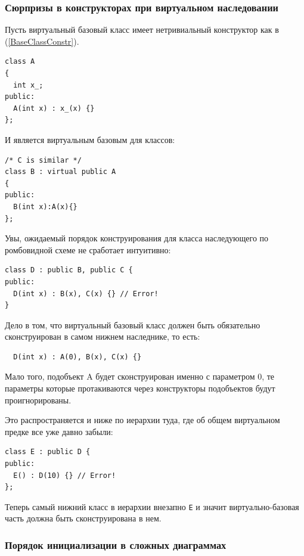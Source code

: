 \documentclass[a4paper,12pt,oneside]{article}
\begin{document}
\subsubsection{Сюрпризы в конструкторах при виртуальном наследовании}\label{VirtualBaseClassConstr}

Пусть виртуальный базовый класс имеет нетривиальный конструктор как в (\ref{BaseClassConstr}).

\begin{lstlisting}
class A 
{
  int x_;
public:
  A(int x) : x_(x) {}
};
\end{lstlisting}

И является виртуальным базовым для классов:

\begin{lstlisting}
/* C is similar */
class B : virtual public A
{
public:
  B(int x):A(x){}
};
\end{lstlisting}

Увы, ожидаемый порядок конструирования для класса наследующего по ромбовидной схеме не сработает интуитивно:

\begin{lstlisting}
class D : public B, public C {
public:
  D(int x) : B(x), C(x) {} // Error!
}
\end{lstlisting}

Дело в том, что виртуальный базовый класс должен быть обязательно сконструирован в самом нижнем наследнике, то есть:

\begin{lstlisting}
  D(int x) : A(0), B(x), C(x) {} 
\end{lstlisting}

Мало того, подобъект A будет сконструирован именно с параметром 0, те параметры которые протакиваются через конструкторы подобъектов будут проигнорированы.

Это распространяется и ниже по иерархии туда, где об общем виртуальном предке все уже давно забыли:

\begin{lstlisting}
class E : public D {
public:
  E() : D(10) {} // Error!
};
\end{lstlisting}

Теперь самый нижний класс в иерархии внезапно \lstinline!E! и значит виртуально-базовая часть должна быть сконструирована в нем.

\subsubsection{Порядок инициализации в сложных диаграммах}\label{InitOrder}
\end{document}

